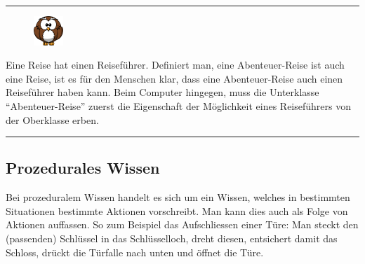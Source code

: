 \noindent\rule[1ex]{\textwidth}{1pt}
\begin{figure}
    \vspace{-14pt}
    \includegraphics[width=0.1\textwidth]{bilder/owl.png}
\end{figure}
Eine Reise hat einen Reiseführer. Definiert man, eine Abenteuer-Reise ist auch eine Reise, ist es für den Menschen klar, dass eine Abenteuer-Reise auch einen Reiseführer haben kann. Beim Computer hingegen, muss die Unterklasse ``Abenteuer-Reise'' zuerst die Eigenschaft der Möglichkeit eines Reiseführers von der Oberklasse erben.\\

\noindent\rule[1ex]{\textwidth}{1pt}

\subsection{Prozedurales Wissen}
\label{subsec:prozedurales_wissen}
Bei prozeduralem Wissen handelt es sich um ein Wissen, welches in bestimmten Situationen bestimmte Aktionen vorschreibt. Man kann dies auch als Folge von Aktionen auffassen. So zum Beispiel das Aufschliessen einer Türe: Man steckt den (passenden) Schlüssel in das Schlüsselloch, dreht diesen, entsichert damit das Schloss, drückt die Türfalle nach unten und öffnet die Türe.

